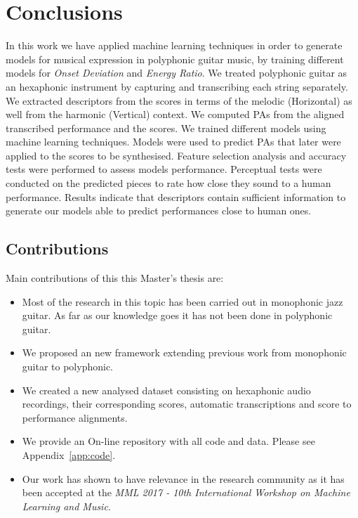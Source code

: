 \chapter{Conclusions}
\label{chap:conclusions}

In this work we have applied machine learning techniques in order to generate models for musical expression in polyphonic guitar music, by training different models for \textit{Onset Deviation} and \textit{Energy Ratio}. We treated polyphonic guitar as an hexaphonic instrument by capturing and transcribing each string separately. We extracted descriptors from the scores in terms of the melodic (Horizontal) as well from the harmonic (Vertical) context. We computed PAs from the aligned transcribed performance and the scores. We trained different models using machine learning techniques. Models were used to predict PAs that later were applied to the scores to be synthesised. Feature selection analysis and accuracy tests were performed to assess models performance. Perceptual tests were conducted on the predicted pieces to rate how close they sound to a human performance. Results indicate that descriptors contain sufficient information to generate our models able to predict performances close to  human ones.

\section{Contributions}
\label{sec:contributions}
Main contributions of this this Master's thesis are:
\begin{itemize}[noitemsep]
\item Most of the research in this topic has been carried out in monophonic jazz guitar. As far as
our knowledge goes it has not been done in polyphonic guitar.
\item We proposed an new framework extending previous work from monophonic guitar to polyphonic.
\item We created a new analysed dataset consisting on hexaphonic audio recordings, their corresponding scores, automatic transcriptions and score to performance alignments. 
\item We provide an On-line repository with all code and data. Please see Appendix~\ref{app:code}.
\item Our work has shown to have relevance in the research community as it has been accepted at the \textit{MML 2017 - 10th International Workshop on Machine Learning and Music}.

\end{itemize}

